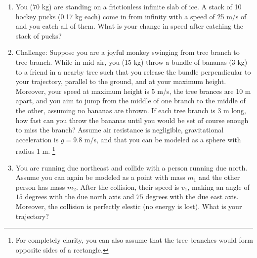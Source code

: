 \documentclass[titlepage]{article}
\begin{document}
\begin{enumerate}
    \item You (70 kg) are standing on a frictionless infinite slab of ice. A stack of 10 hockey pucks (0.17 kg each) come in from infinity with a speed of 25 m/s of and you catch all of them. What is your change in speed after catching the stack of pucks? 
    \item Challenge: Suppose you are a joyful monkey swinging from tree branch to tree branch. While in mid-air, you (15 kg) throw a bundle of bananas (3 kg) to a friend in a nearby tree such that you release the bundle perpendicular to your trajectory, parallel to the ground, and at your maximum height. Moreover, your speed at maximum height is 5 m/s, the tree brances are 10 m apart, and you aim to jump from the middle of one branch to the middle of the other, assuming no bananas are thrown. If each tree branch is 3 m long, how fast can you throw the bananas until you would be set of course enough to miss the branch? Assume air resistance is negligible, gravitational acceleration is $g = 9.8$ m/s, and that you can be modeled as a sphere with radius 1 m. \footnote{For completely clarity, you can also assume that the tree branches would form opposite sides of a rectangle.}\\
    \item You are running due northeast and collide with a person running due north. Assume you can again be modeled as a point with mass $m_1$ and the other person has mass $m_2$. After the collision, their speed is $v_1$, making an angle of $15$ degrees with the due north axis and $75$ degrees with the due east axis. Moreover, the collision is perfectly elestic (no energy is lost). What is your trajectory?
\end{enumerate}



\end{document}
